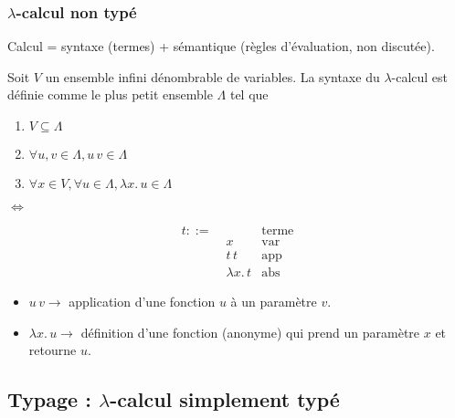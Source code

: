 \documentclass{beamer}
\newcommand{\lambdaExpr}[2]{\lambda #1 . \, #2}
\begin{document}
\begin{frame}
  \frametitle{$\lambda$-calcul non typé}
  Calcul = syntaxe (termes) + sémantique (règles d'évaluation, non discutée).

  Soit $V$ un ensemble infini dénombrable de variables. La syntaxe du
  $\lambda$-calcul est définie comme le plus petit ensemble $\Lambda$ tel que

  \begin{minipage}{0.45\textwidth}
    \begin{enumerate}
    \item $V \subseteq \Lambda$
    \item $\forall u, v \in \Lambda, u \, v \in \Lambda$
    \item $\forall x \in V, \forall u \in \Lambda, \lambdaExpr{x}{u} \in \Lambda$
    \end{enumerate}
  \end{minipage}
  \begin{minipage}{0.05\textwidth}
    $\Leftrightarrow$
  \end{minipage}
  \begin{minipage}{0.45\textwidth}
    \begin{align*}
      t ::= & \, & \text{terme} \\
        & \; x & \text{var} \\
        & \; t \, t & \text{app} \\
        & \; \lambdaExpr{x}{t} & \text{abs}
    \end{align*}
  \end{minipage}
  \begin{itemize}
  \item $u \, v \rightarrow$ application d'une fonction $u$ à un paramètre $v$.
  \item $\lambdaExpr{x}{u} \rightarrow$ définition d'une fonction (anonyme) qui
    prend un paramètre $x$ et retourne $u$. 
  \end{itemize}
\end{frame}


\subsection*{Typage : $\lambda$-calcul simplement typé}
\end{document}
